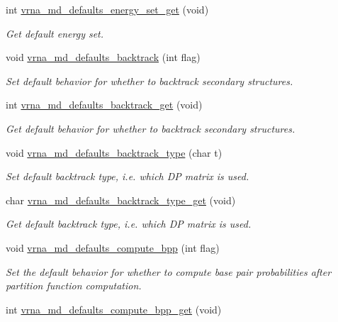 \begin{DoxyCompactItemize}
int \hyperlink{group__model__details_ga017ed6afb1cba2b7f242412cab618b53}{vrna\+\_\+md\+\_\+defaults\+\_\+energy\+\_\+set\+\_\+get} (void)
\begin{DoxyCompactList}\small\item\em Get default energy set. \end{DoxyCompactList}\item 
void \hyperlink{group__model__details_ga978c468b2fe96a70d5191e3dd17d5599}{vrna\+\_\+md\+\_\+defaults\+\_\+backtrack} (int flag)
\begin{DoxyCompactList}\small\item\em Set default behavior for whether to backtrack secondary structures. \end{DoxyCompactList}\item 
int \hyperlink{group__model__details_ga90da1156e6883ddd68527c2830706648}{vrna\+\_\+md\+\_\+defaults\+\_\+backtrack\+\_\+get} (void)
\begin{DoxyCompactList}\small\item\em Get default behavior for whether to backtrack secondary structures. \end{DoxyCompactList}\item 
void \hyperlink{group__model__details_ga68305274de96b56b7799575e222560d8}{vrna\+\_\+md\+\_\+defaults\+\_\+backtrack\+\_\+type} (char t)
\begin{DoxyCompactList}\small\item\em Set default backtrack type, i.\+e. which DP matrix is used. \end{DoxyCompactList}\item 
char \hyperlink{group__model__details_ga1425b4ebd0e034dead66d79becd64143}{vrna\+\_\+md\+\_\+defaults\+\_\+backtrack\+\_\+type\+\_\+get} (void)
\begin{DoxyCompactList}\small\item\em Get default backtrack type, i.\+e. which DP matrix is used. \end{DoxyCompactList}\item 
void \hyperlink{group__model__details_gaf1b5db10f1f476767f9a95f8a78e3132}{vrna\+\_\+md\+\_\+defaults\+\_\+compute\+\_\+bpp} (int flag)
\begin{DoxyCompactList}\small\item\em Set the default behavior for whether to compute base pair probabilities after partition function computation. \end{DoxyCompactList}\item 
int \hyperlink{group__model__details_gaa3a537e61fbe0518673bf9f73fd820f3}{vrna\+\_\+md\+\_\+defaults\+\_\+compute\+\_\+bpp\+\_\+get} (void)

\end{DoxyCompactItemize}
